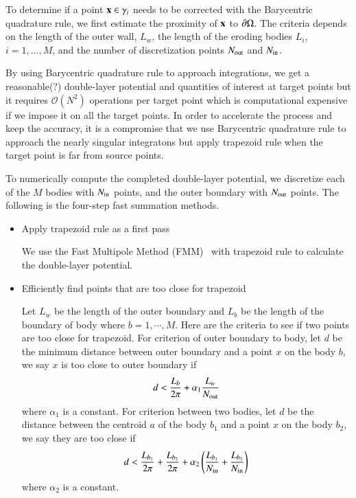 \documentclass[preprint, 10pt]{elsarticle}
\begin{document}
To determine if a point ${\mathbf{x}} \in \gamma_i$ needs to be corrected with
the Barycentric quadrature rule, we first estimate the proximity of
${\mathbf{x}}$ to ${\partial}\Omega$.  The criteria depends on the length of the outer
wall, $L_w$, the length of the eroding bodies $L_i$, $i=1,\ldots,M$, and
the number of discretization points $N_{\mathrm{out}}$ and $N_{\mathrm{in}}$.  


{\color{red}
By using Barycentric quadrature rule to approach integrations, we get a reasonable(?) double-layer potential and quantities of interest at target points but it requires $\mathcal{O}(N^2)$ operations per target point which is computational expensive if we impose it on all the target points. In order to accelerate the process and keep the accuracy, it is a compromise that we use Barycentric quadrature rule to approach the nearly singular integratons but apply trapezoid rule when the target point is far from source points. 


To numerically compute the completed double-layer potential, we discretize each of the $M$ bodies with  $N_{\mathrm{in}}$ points, and the outer boundary with $N_{\mathrm{out}}$ points. The following is the four-step fast summation methods.
}
\begin{itemize}
  \item Apply trapezoid rule as a first pass

{\color{red} We use the Fast Multipole Method (FMM)~\cite{gre-rok1987, gre-gre-may1992} with trapezoid rule to calculate the double-layer potential.
}
  \item Efficiently find points that are too close for trapezoid

{\color{red}
 Let $L_w$ be the length of the outer boundary and $L_{b}$ be the length of the boundary of body where $b=1, \cdots, M$. Here are the criteria to see if two points are too close for trapezoid. For criterion of outer boundary to body,  let $d$ be the minimum distance between outer boundary and a point $x$ on the body $b$, we say $x$ is too close to outer boundary if
\begin{equation}\label{eqn:Cw2b}
d<\frac{L_{b}}{2\pi} + \alpha_1\frac{L_w}{N_{\mathrm{out}}}
\end{equation}
where $\alpha_1$ is a constant. 
For criterion between two bodies, let $d$ be the distance between the centroid $a$ of the body $b_1$ and a point $x$ on the body $b_2$, we say they are too close if
\begin{equation}\label{eqn:Cb2b}
d<\frac{L_{b_1}}{2\pi}+\frac{L_{b_2}}{2\pi}+\alpha_2\left(\frac{L_{b_1}}{N_{\mathrm{in}}}+\frac{L_{b_2}}{N_{\mathrm{in}}}\right)
\end{equation}
where $\alpha_2$ is a constant. 

}
\end{itemize}
\end{document}

